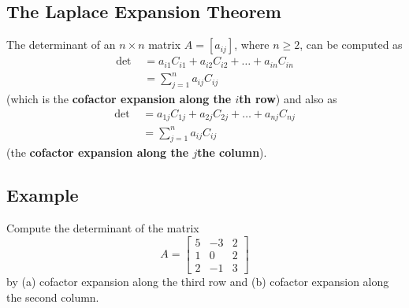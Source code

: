 \subsection*{The Laplace Expansion Theorem}
The determinant of an $n\times n$ matrix $A=[a_{ij}]$, where $n\geq2$, can be computed as
\begin{align*}
    \text{det } & =a_{i1}C_{i1}+a_{i2}C_{i2}+\dots+a_{in}C_{in} \\
                & =\sum_{j=1}^n a_{ij}C_{ij}
\end{align*}
(which is the \textbf{cofactor expansion along the $i$th row}) and also as
\begin{align*}
    \text{det } & =a_{1j}C_{1j}+a_{2j}C_{2j}+\dots+a_{nj}C_{nj} \\
                & =\sum_{j=1}^n a_{ij}C_{ij}
\end{align*}
(the \textbf{cofactor expansion along the $j$the column}).

\subsection*{Example}
Compute the determinant of the matrix
\[A=\begin{bmatrix}
        5 & -3 & 2 \\
        1 & 0  & 2 \\
        2 & -1 & 3
    \end{bmatrix}\]
by (a) cofactor expansion along the third row and (b) cofactor expansion along the second column.

